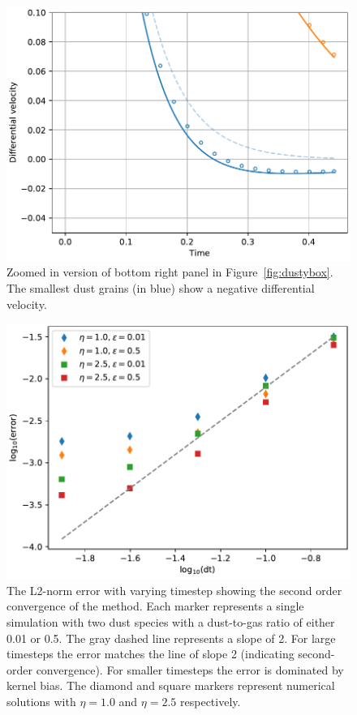 \documentclass[fleqn,usenatbib]{mnras}
\begin{document}
\begin{figure}
   \begin{center}
      \includegraphics[width=\columnwidth]{figs/dustybox_differential_velocity_comparison_zoomed.pdf}
      \caption{Zoomed in version of bottom right panel in
         Figure~\ref{fig:dustybox}. The smallest dust grains (in blue) show a
         negative differential velocity.%
         \label{fig:dustybox-zoomed}}
   \end{center}
\end{figure}

\begin{figure}
   \begin{center}
      \includegraphics[width=\columnwidth]{figs/dustybox_accuracy.pdf}
      \caption{The L2-norm error with varying timestep showing the second order
         convergence of the method. Each marker represents a single simulation
         with two dust species with a dust-to-gas ratio of either 0.01 or 0.5.
         The gray dashed line represents a slope of 2. For large timesteps the
         error matches the line of slope 2 (indicating second-order
         convergence). For smaller timesteps the error is dominated by kernel
         bias. The diamond and square markers represent numerical solutions with
         \(\eta=1.0\) and \(\eta=2.5\) respectively.%
         \label{fig:dustybox-accuracy}}
   \end{center}
\end{figure}
\end{document}

